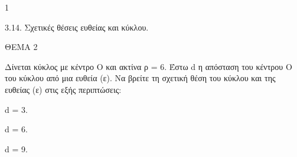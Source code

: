 \begin{ylh}{1}
    \item 3.14. Σχετικές θέσεις ευθείας και κύκλου.
\end{ylh}

ΘΕΜΑ 2

Δίνεται κύκλος με κέντρο Ο και ακτίνα ρ = 6. Έστω d η απόσταση του κέντρου Ο του κύκλου από μια ευθεία (ε). Να βρείτε τη σχετική θέση του κύκλου και της ευθείας (ε) στις εξής περιπτώσεις:

\begin{alist}
\item d = 3. 

\item d = 6. 

\item d = 9. 
\end{alist}
